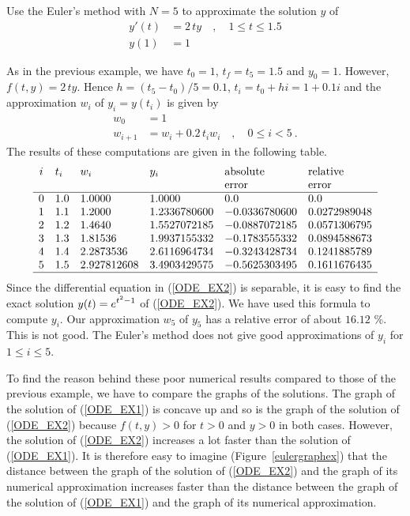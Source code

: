 \begin{egg}
Use the Euler's method with $N=5$ to approximate the solution $y$ of
\begin{equation}\label{ODE_EX2}
\begin{split}
y'(t) & =  2\,ty \quad, \quad 1 \leq t \leq 1.5 \\
y(1) & =  1
\end{split}
\end{equation}

As in the previous example, we have $t_0=1$, $t_f= t_5 =1.5$  and
$y_0=1$.  However, $f(t,y) = 2\,ty$.  Hence $h = (t_5-t_0)/5 = 0.1$,
$t_i = t_0 + hi =1 + 0.1i$ and the approximation $w_i$ of
$y_i = y(t_i)$ is given by
\begin{align*}
w_0 & = 1 \\
w_{i+1} & = w_i + 0.2\,t_i w_i \quad, \quad 0 \leq i < 5 \ .
\end{align*}
The results of these computations are given in the following table.
\[
\begin{array}{clllll}
i & t_i & w_i & y_i & \text{absolute} & \text{relative} \\
 & & & & \text{error} & \text{error} \\
\hline
0 & 1.0 & 1.0000 & 1.0000 & 0.0 & 0.0 \\
1 & 1.1 & 1.2000 & 1.2336780600 & -0.0336780600 & 0.0272989048 \\
2 & 1.2 & 1.4640 & 1.5527072185 & -0.0887072185 & 0.0571306795 \\
3 & 1.3 & 1.81536 & 1.9937155332 & -0.1783555332 & 0.0894588673 \\
4 & 1.4 & 2.2873536 & 2.6116964734 & -0.3243428734 & 0.1241885789 \\
5 & 1.5 & 2.927812608 & 3.4903429575 & -0.5625303495 & 0.1611676435 \\
\hline
\end{array}
\]
Since the differential equation in (\ref{ODE_EX2}) is separable, it is
easy to find the exact solution $\displaystyle y(t) = e^{t^2 -1}$ of
(\ref{ODE_EX2}).  We have used this formula to compute $y_i$.
Our approximation $w_5$ of $y_5$ has a relative error of about $16.12$ \%.
This is not good.  The Euler's method does not give good
approximations of $y_i$ for $1 \leq i \leq 5$.

To find the reason behind these poor numerical results compared to those
of the previous example, we have to compare the graphs of the
solutions.  The graph of the solution of (\ref{ODE_EX1}) is concave
up and so is the graph of the solution of (\ref{ODE_EX2})
because $f(t,y) >0$ for $t>0$ and $y>0$ in both cases.  However,
the solution of (\ref{ODE_EX2}) increases a lot faster than the
solution of (\ref{ODE_EX1}).  It is therefore easy to imagine
(Figure~\ref{eulergraphex}) that the distance between the graph of the
solution of (\ref{ODE_EX2}) and the graph of its numerical
approximation increases faster than the distance
between the graph of the solution of (\ref{ODE_EX1}) and the graph of
its numerical approximation.
\label{Euler_EX2}
\end{egg}

